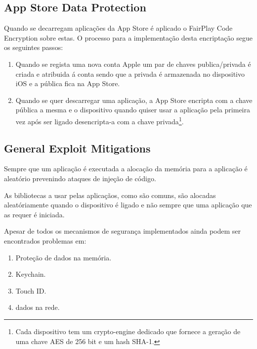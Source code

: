 \subsection{ App Store Data Protection}
\hfill\par
	Quando se decarregam aplicações da App Store é aplicado o FairPlay Code Encryption sobre estas. O processo para a implementação desta encriptação segue os seguintes passos:\par
	\begin{enumerate}
	\item Quando se regista uma nova conta Apple um par de chaves publica/privada é criada e atribuida á conta sendo que a privada é armazenada no dispositivo iOS e a pública fica na App Store.\par
	\item Quando se quer descarregar uma aplicação, a App Store encripta com a chave pública a mesma e o dispositivo quando quiser usar a aplicação pela primeira vez após ser ligado desencripta-a com a chave privada\footnote[3]{Cada dispositivo tem um crypto-engine dedicado que fornece a geração de uma chave AES de 256 bit e um hash SHA-1.}.\par
\end{enumerate}

\subsection{ General Exploit Mitigations}
\hfill\par
	Sempre que um aplicação é executada a alocação da memória para a aplicação é aleatório prevenindo ataques de injeção de código.\par
	As bibliotecas a usar pelas aplicaçãos, como são comuns, são alocadas aleatóriamente quando o dispositivo é ligado e não sempre que uma aplicação que as requer é iniciada.\par
\hfill\par
\hfill\par
Apesar de todos os mecanismos de segurança implementados ainda podem ser encontrados problemas em:
\renewcommand{\theenumi}{\Roman{enumi}}
\begin{enumerate}
	\item Proteção de dados na memória.
	\item Keychain.
	\item Touch ID.
	\item dados na rede.
\end{enumerate}
\renewcommand{\theenumi}{\arabic{enumi}}


